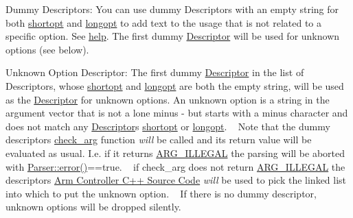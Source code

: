 \begin{DoxyParagraph}{Dummy Descriptors\+:}
You can use dummy Descriptors with an empty string for both \hyperlink{structoption_1_1Descriptor_a0dba4ccca59c19d6ed4081391fca5adb}{shortopt} and \hyperlink{structoption_1_1Descriptor_a470c449dfa894c9bfda2dae026142b4b}{longopt} to add text to the usage that is not related to a specific option. See \hyperlink{structoption_1_1Descriptor_a9045b19311533e1b8a08645d57149c79}{help}. The first dummy \hyperlink{structoption_1_1Descriptor}{Descriptor} will be used for unknown options (see below).
\end{DoxyParagraph}
\begin{DoxyParagraph}{Unknown Option Descriptor\+:}
The first dummy \hyperlink{structoption_1_1Descriptor}{Descriptor} in the list of Descriptors, whose \hyperlink{structoption_1_1Descriptor_a0dba4ccca59c19d6ed4081391fca5adb}{shortopt} and \hyperlink{structoption_1_1Descriptor_a470c449dfa894c9bfda2dae026142b4b}{longopt} are both the empty string, will be used as the \hyperlink{structoption_1_1Descriptor}{Descriptor} for unknown options. An unknown option is a string in the argument vector that is not a lone minus {\ttfamily \textquotesingle{}-\/\textquotesingle{}} but starts with a minus character and does not match any \hyperlink{structoption_1_1Descriptor}{Descriptor}\textquotesingle{}s \hyperlink{structoption_1_1Descriptor_a0dba4ccca59c19d6ed4081391fca5adb}{shortopt} or \hyperlink{structoption_1_1Descriptor_a470c449dfa894c9bfda2dae026142b4b}{longopt}. ~\newline
Note that the dummy descriptor\textquotesingle{}s \hyperlink{structoption_1_1Descriptor_aa5d675dba0214a4abd73007ff163cc67}{check\+\_\+arg} function {\itshape will} be called and its return value will be evaluated as usual. I.\+e. if it returns \hyperlink{namespaceoption_aee8c76a07877335762631491e7a5a1a9a9528e32563b795bd2930b12d0a5e382d}{A\+R\+G\+\_\+\+I\+L\+L\+E\+G\+AL} the parsing will be aborted with {\ttfamily \hyperlink{classoption_1_1Parser_a2caa149140067b4d13e4d7a104bb3090}{Parser\+::error()}==true}. ~\newline
if {\ttfamily check\+\_\+arg} does not return \hyperlink{namespaceoption_aee8c76a07877335762631491e7a5a1a9a9528e32563b795bd2930b12d0a5e382d}{A\+R\+G\+\_\+\+I\+L\+L\+E\+G\+AL} the descriptor\textquotesingle{}s \hyperlink{index}{Arm Controller C++ Source Code} {\itshape will} be used to pick the linked list into which to put the unknown option. ~\newline
If there is no dummy descriptor, unknown options will be dropped silently. 
\end{DoxyParagraph}
\mbox{\label{structoption_1_1Descriptor_a0dba4ccca59c19d6ed4081391fca5adb}} 
